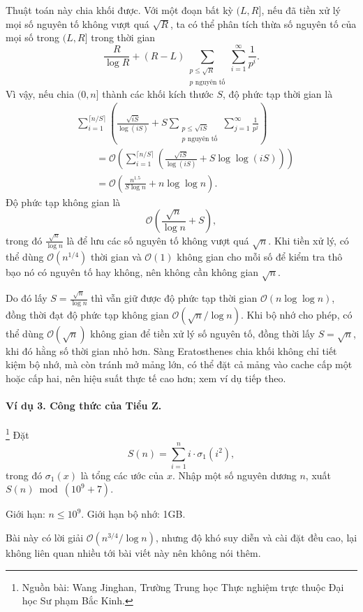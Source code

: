 \documentclass[11pt]{article}
\newcommand{\Oh}{\mathcal{O}}
\begin{document}
Thuật toán này chia khối được. Với một đoạn bất kỳ \((L,R]\), nếu đã tiền xử
lý mọi số nguyên tố không vượt quá \(\sqrt R\), ta có thể phân tích thừa số
nguyên tố của mọi số trong \((L,R]\) trong thời gian
\[
  \frac{R}{\log R}
  +(R-L)\sum_{\substack{p\le\sqrt R\\p\text{ nguyên tố}}}
  \sum_{i=1}^{\infty}\frac1{p^i}.
\]
Vì vậy, nếu chia \((0,n]\) thành các khối kích thước \(S\), độ phức tạp thời
gian là
\[
\begin{aligned}
&\sum_{i=1}^{\lceil n/S\rceil}
\left(
  \frac{\sqrt{iS}}{\log(iS)}
  +S\sum_{\substack{p\le\sqrt{iS}\\p\text{ nguyên tố}}}
  \sum_{j=1}^{\infty}\frac1{p^j}
\right)\\
&\qquad =
\Oh\left(
\sum_{i=1}^{\lceil n/S\rceil}
\left(
  \frac{\sqrt{iS}}{\log(iS)}+S\log\log(iS)
\right)
\right)\\
&\qquad =
\Oh\left(\frac{n^{1.5}}{S\log n}+n\log\log n\right).
\end{aligned}
\]
Độ phức tạp không gian là
\[
  \Oh\left(\frac{\sqrt n}{\log n}+S\right),
\]
trong đó \(\frac{\sqrt n}{\log n}\) là để lưu các số nguyên tố không vượt quá
\(\sqrt n\). Khi tiền xử lý, có thể dùng \(\Oh(n^{1/4})\) thời gian và
\(\Oh(1)\) không gian cho mỗi số để kiểm tra thô bạo nó có nguyên tố hay
không, nên không cần không gian \(\sqrt n\).

Do đó lấy \(S=\frac{\sqrt n}{\log n}\) thì vẫn giữ được độ phức tạp thời gian
\(\Oh(n\log\log n)\), đồng thời đạt độ phức tạp không gian
\(\Oh(\sqrt n/\log n)\). Khi bộ nhớ cho phép, có thể dùng \(\Oh(\sqrt n)\)
không gian để tiền xử lý số nguyên tố, đồng thời lấy \(S=\sqrt n\), khi đó
hằng số thời gian nhỏ hơn. Sàng Eratosthenes chia khối không chỉ tiết kiệm bộ
nhớ, mà còn tránh mở mảng lớn, có thể đặt cả mảng vào cache cấp một hoặc cấp
hai, nên hiệu suất thực tế cao hơn; xem ví dụ tiếp theo.

\paragraph{Ví dụ 3. Công thức của Tiểu Z.}
\footnote{Nguồn bài: Wang Jinghan, Trường Trung học Thực nghiệm trực thuộc Đại
học Sư phạm Bắc Kinh.}
Đặt
\[
  S(n)=\sum_{i=1}^{n} i\cdot \sigma_1(i^2),
\]
trong đó \(\sigma_1(x)\) là tổng các ước của \(x\). Nhập một số nguyên dương
\(n\), xuất \(S(n)\bmod (10^9+7)\).

Giới hạn: \(n\le 10^9\). Giới hạn bộ nhớ: 1GB.

Bài này có lời giải \(\Oh(n^{3/4}/\log n)\), nhưng độ khó suy diễn và cài đặt
đều cao, lại không liên quan nhiều tới bài viết này nên không nói thêm.
\end{document}
